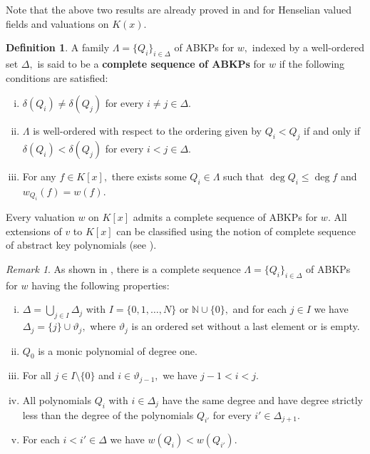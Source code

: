 \documentclass[11pt]{amsart}
\theoremstyle{definition}
\newtheorem{definition}[theorem]{Definition}
\theoremstyle{remark}
\newtheorem{remark}[theorem]{Remark}
\numberwithin{equation}{section}
\begin{document}
	Note that the above two results are already proved in \cite[Lemma 2.3]{SA3} and \cite[Theorem 1.13]{SA3} for Henselian valued fields and valuations on $K(x).$
	\begin{definition}
		A family $\Lambda=\{Q_i\}_{i\in\Delta}$ of ABKPs for $w,$ indexed by a well-ordered set $\Delta,$ is said to be a {\bf complete sequence of ABKPs} for $w$ if the following conditions are satisfied:
		\begin{enumerate}[(i)]
			\item $\delta(Q_i)\neq \delta(Q_j)$ for every $i\neq j\in\Delta.$
			\item $\Lambda$ is well-ordered with respect to the ordering given by $Q_i< Q_j$ if and only if  $\delta(Q_i)<\delta(Q_j)$ for every $i<j\in \Delta.$ 
			\item For any $f\in K[x],$ there exists some $Q_i \in \Lambda$ such that $\deg Q_i\leq \deg f$ and  $w_{Q_i}(f)=w(f).$
		\end{enumerate}
	\end{definition}
	
	Every valuation $w$ on $K[x]$ admits a complete sequence of ABKPs for $w.$ 	All  extensions of $v$ to $K[x]$ can be classified using the  notion of complete sequence of abstract key polynomials  (see \cite{W}). 
	
	\begin{remark} 
		As shown in \cite[Remark 4.6]{W}, there is a complete sequence  $\Lambda=\{Q_i\}_{i\in\Delta}$ of ABKPs  for  $w$ having the following properties:
		\begin{enumerate}[(i)]
			\item $\Delta=\bigcup_{j\in I}\Delta_j$ with $I=\{0,1,\ldots, N\}$ or $\mathbb{N}\cup\{0\},$ and for each $j\in I$ we have $\Delta_j=\{j\}\cup\vartheta_{j},$ where $\vartheta_j$ is an ordered set without a last element or is empty.
			\item $Q_0$ is a monic polynomial of degree one.
			\item For all $j\in I\setminus \{0\}$ and $i \in\vartheta_{j-1},$ we have $j-1<i<j.$ 
			\item All  polynomials $Q_i$ with $i\in\Delta_j$ have the same degree and  have degree strictly  less than  the degree of the polynomials $Q_{i'}$ for every $i'\in\Delta_{j+1}.$
			\item For each $i<i'\in\Delta$ we have $w(Q_i)<w(Q_{i'}).$
		\end{enumerate}
	\end{remark}
	
\end{document}
